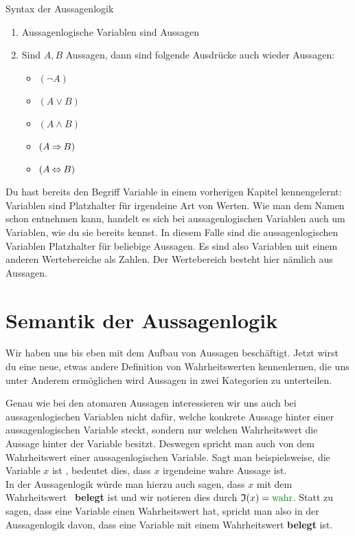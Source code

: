 \documentclass[../../main.tex]{subfiles}
\begin{document}
    \begin{definition}{Syntax der Aussagenlogik}
        \begin{enumerate}

            \item Aussagenlogische Variablen sind Aussagen 
            \item Sind $A,B$ Aussagen, dann sind folgende Ausdrücke auch wieder Aussagen:
                \begin{itemize}
                    \item $(\lnot A)$
                    \item $(A \lor B)$
                    \item $(A \land B)$
                    \item $(A \mathbin{\Rightarrow} B)$
                    \item $(A \mathbin{\Leftrightarrow} B)$
                \end{itemize}

        \end{enumerate}
    \end{definition}

    Du hast bereits den Begriff Variable in einem vorherigen Kapitel kennengelernt: Variablen sind 
    Platzhalter für irgendeine Art von Werten. Wie man dem Namen schon entnehmen 
    kann, handelt es sich bei aussagenlogischen Variablen auch um Variablen, wie 
    du sie bereits kennst. In diesem Falle sind die aussagenlogischen Variablen 
    Platzhalter für beliebige Aussagen. Es sind also Variablen mit einem anderen 
    Wertebereiche als Zahlen. Der Wertebereich besteht hier nämlich aus Aussagen.

    \section*{Semantik der Aussagenlogik}
    Wir haben uns bis eben mit dem Aufbau von Aussagen beschäftigt. 
    Jetzt wirst du eine neue, etwas andere Definition von Wahrheitswerten 
    kennenlernen, die uns unter Anderem ermöglichen wird Aussagen in zwei Kategorien zu unterteilen.


    Genau wie bei den atomaren Aussagen interessieren wir uns auch bei 
    aussagenlogischen Variablen 
    nicht dafür, welche 
    konkrete Aussage hinter einer aussagenlogischen Variable steckt, 
    sondern nur welchen Wahrheitswert die Aussage hinter der Variable besitzt. 
    Deswegen spricht man auch von dem Wahrheitswert einer 
    aussagenlogischen Variable.
    Sagt man beispielsweise, die Variable $x$ ist \wahr, bedeutet dies, 
    dass $x$ irgendeine wahre Aussage ist. \\
    In der Aussagenlogik würde man hierzu auch sagen, dass 
    $x$ mit dem Wahrheitswert \wahr\ \textbf{belegt} ist und wir notieren 
    dies durch $\mathfrak{I}(x) = \wahr$. 
    Statt zu sagen, dass eine Variable einen Wahrheitswert hat, spricht 
    man also in der Aussagenlogik davon, dass eine Variable mit einem Wahrheitswert 
    \textbf{belegt} ist. 
\end{document}
